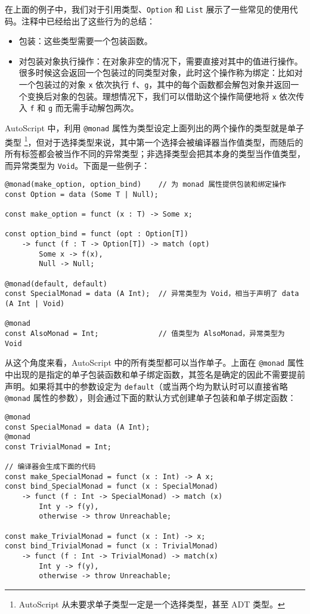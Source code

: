在上面的例子中，我们对于引用类型、\lstinline!Option! 和 \lstinline!List! 展示了一些常见的使用代码。注释中已经给出了这些行为的总结：

\begin{itemize}
	\item 包装：这些类型需要一个包装函数。
	\item 对包装对象执行操作：在对象非空的情况下，需要直接对其中的值进行操作。很多时候这会返回一个包装过的同类型对象，此时这个操作称为绑定：比如对一个包装过的对象 \lstinline!x! 依次执行 \lstinline!f!、\lstinline!g!，其中的每个函数都会解包对象并返回一个变换后对象的包装。理想情况下，我们可以借助这个操作简便地将 \lstinline!x! 依次传入 \lstinline!f! 和 \lstinline!g! 而无需手动解包两次。
\end{itemize}

AutoScript 中，利用 \lstinline!@monad! 属性为类型设定上面列出的两个操作的类型就是单子类型 \footnote{AutoScript 从未要求单子类型一定是一个选择类型，甚至 ADT 类型。}，但对于选择类型来说，其中第一个选择会被编译器当作值类型，而随后的所有标签都会被当作不同的异常类型；非选择类型会把其本身的类型当作值类型，而异常类型为 \lstinline!Void!。下面是一些例子：

\begin{minipage}[c]{0.95\textwidth}
\vspace{1.0em}
\begin{lstlisting}
@monad(make_option, option_bind)	// 为 monad 属性提供包装和绑定操作
const Option = data (Some T | Null);

const make_option = funct (x : T) -> Some x;

const option_bind = funct (opt : Option[T]) 
    -> funct (f : T -> Option[T]) -> match (opt)
	    Some x -> f(x),
	    Null -> Null;

@monad(default, default)
const SpecialMonad = data (A Int);	// 异常类型为 Void，相当于声明了 data (A Int | Void)

@monad
const AlsoMonad = Int;				// 值类型为 AlsoMonad，异常类型为 Void
\end{lstlisting}
\end{minipage}

从这个角度来看，AutoScript 中的所有类型都可以当作单子。上面在 \lstinline!@monad! 属性中出现的是指定的单子包装函数和单子绑定函数，其签名是确定的因此不需要提前声明。如果将其中的参数设定为 \lstinline!default!（或当两个均为默认时可以直接省略 \lstinline!@monad! 属性的参数），则会通过下面的默认方式创建单子包装和单子绑定函数：

\begin{lstlisting}
@monad
const SpecialMonad = data (A Int);
@monad
const TrivialMonad = Int;

// 编译器会生成下面的代码
const make_SpecialMonad = funct (x : Int) -> A x;
const bind_SpecialMonad = funct (x : SpecialMonad) 
    -> funct (f : Int -> SpecialMonad) -> match (x)
        Int y -> f(y),
        otherwise -> throw Unreachable;
        
const make_TrivialMonad = funct (x : Int) -> x;
const bind_TrivialMonad = funct (x : TrivialMonad)
    -> funct (f : Int -> TrivialMonad) -> match(x)
        Int y -> f(y),
        otherwise -> throw Unreachable;
\end{lstlisting}

